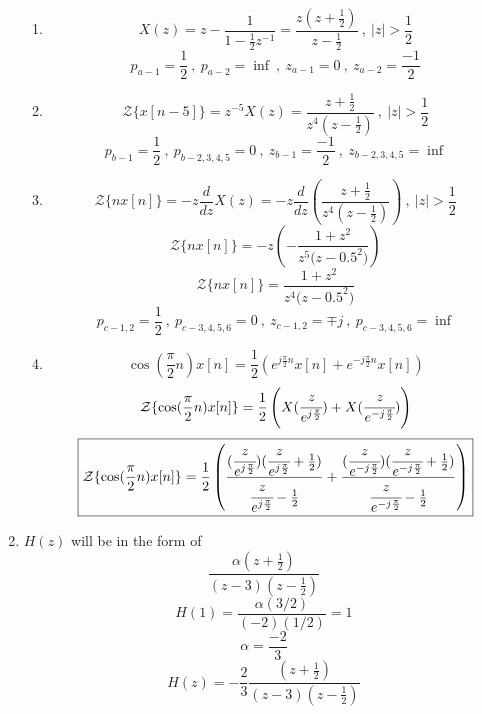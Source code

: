 \documentclass[a4paper,12pt]{article}
\begin{document}
\begin{enumerate}
		\begin{enumerate}
			\item $$\boxed{	X(z)=z-\frac{1}{1-\frac{1}{2}z^{-1}}=\frac{z(z+\frac{1}{2})}{z-\frac{1}{2}} \ , \ |z|>\frac{1}{2}	}$$
			$$ \boxed{ p_{a-1}=\frac{1}{2}} \ ,\ \boxed{ p_{a-2}=\inf} \ ,\  \boxed{z_{a-1}=0} \ ,\ \boxed{z_{a-2}=\frac{-1}{2}}  $$
			\item $$\boxed{ \mathcal{Z} \{x[n-5] \} = z^{-5}X(z)=\frac{z+\frac{1}{2}}{z^4(z-\frac{1}{2})} \ , \ |z|>\frac{1}{2}  }$$	
			$$ \boxed{ p_{b-1}=\frac{1}{2}} \ ,\ \boxed{p_{b-2,3,4,5}=0} \ ,\ \boxed{z_{b-1}=\frac{-1}{2}} \ ,\ \boxed{z_{b-2,3,4,5}=\inf} $$
			\item $$ \mathcal{Z} \{nx[n] \} =-z\frac{d}{dz}X(z)=	-z\frac{d}{dz}(\frac{z+\frac{1}{2}}{z^4(z-\frac{1}{2})}) \ , \ |z|>\frac{1}{2} $$
				$$  \mathcal{Z} \{nx[n] \} = -z\left( -\frac{1+z^2}{z^5{(z-0.5}^2)}\right)$$
				$$ \boxed{	\mathcal{Z} \{nx[n] \} = \frac{1+z^2}{z^4{(z-0.5}^2)}}$$
				$$ \boxed{ p_{c-1,2}=\frac{1}{2}} \ ,\ \boxed{ p_{c-3,4,5,6}=0} \ ,\ \boxed{ z_{c-1,2}=\mp j} \ ,\ \boxed{ p_{c-3,4,5,6}=\inf} $$
			\item $$ \cos(\frac{\pi}{2}n)x[n] = \frac{1}{2} \left( e^{j\frac{\pi}{2}n}x[n]+e^{-j\frac{\pi}{2}n}x[n]	\right) $$
			$$ \mathcal{Z} \{\cos(\frac{\pi}{2}n)x[n]\}= \frac{1}{2} \left( X(\cfrac{z}{e^{j\frac{\pi}{2}}}) + X(\cfrac{z}{e^{-j\frac{\pi}{2}}})  \right) $$
			$$\boxed{ \mathcal{Z} \{ \cos(\frac{\pi}{2}n)x[n]\}=\frac{1}{2}\left( 
			\frac{(\cfrac{z}{e^{j\frac{\pi}{2}}})(\cfrac{z}{e^{j\frac{\pi}{2}}}+\frac{1}{2})}{\cfrac{z}{e^{j\frac{\pi}{2}}}-\frac{1}{2}}  +  \frac{(\cfrac{z}{e^{-j\frac{\pi}{2}}})(\cfrac{z}{e^{-j\frac{\pi}{2}}}+\frac{1}{2})}{\cfrac{z}{e^{-j\frac{\pi}{2}}}-\frac{1}{2}}
			\right) }$$
			
		\end{enumerate}
		
	\item $H(z)$ will be in the form of 
		$$\frac{\alpha (z+\frac{1}{2})}{(z-3)(z-\frac{1}{2})} $$
		$$ H(1)=\frac{\alpha (3/2)}{(-2)(1/2)}=1$$
		$$ \boxed{	\alpha=\frac{-2}{3}	}$$
		$$\boxed{ H(z)=-\frac{2}{3}\frac{ (z+\frac{1}{2})}{(z-3)(z-\frac{1}{2})} }$$
		

\end{enumerate}
\end{document}
